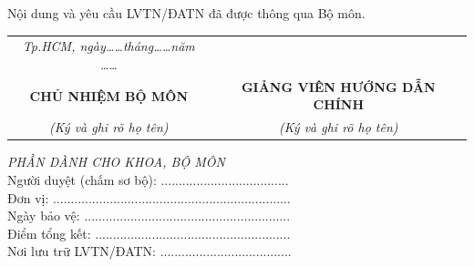 Nội dung và yêu cầu LVTN/ĐATN đã được thông qua Bộ môn.

\begin{tabular}{p{} p{}}
    \multicolumn{1}{c}{\textit{Tp.HCM, ngày\dots\dots tháng\dots\dots năm \dots\dots}} &  \\
    \multicolumn{1}{c}{\textbf{CHỦ NHIỆM BỘ MÔN}} & \multicolumn{1}{c}{\textbf{GIẢNG VIÊN HƯỚNG DẪN CHÍNH}} \\
    \multicolumn{1}{c}{\textit{(Ký và ghi rõ họ tên)}} & \multicolumn{1}{c}{\textit{(Ký và ghi rõ họ tên)}} \\
\end{tabular}

\vspace{30pt}
\hphantom{..}\textit{PHẦN DÀNH CHO KHOA, BỘ MÔN}\\
\hphantom{..}Người duyệt (chấm sơ bộ): ....................................\\
\hphantom{..}Đơn vị: ...................................................................\\
\hphantom{..}Ngày bảo vệ: ..........................................................\\
\hphantom{..}Điểm tổng kết: .......................................................\\
\hphantom{..}Nơi lưu trữ LVTN/ĐATN: .....................................\\